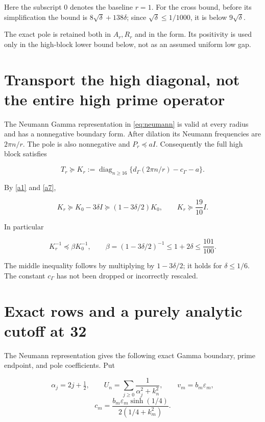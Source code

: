 \documentclass[11pt]{article}
\begin{document}
Here the subscript 0 denotes the baseline \(r=1\). For the cross bound, before its simplification the bound is
\(8\sqrt\delta+138\delta\); since \(\sqrt\delta\le1/1000\), it is below \(9\sqrt\delta\).

The exact pole is retained both in \(A_r,R_r\) and in the form. Its positivity is used only in the high-block lower bound below, not as an assumed uniform low gap.

\section{Transport the high diagonal, not the entire high prime operator}

The Neumann Gamma representation in \eqref{eq:neumann} is valid at every radius and has a nonnegative boundary form. After dilation its Neumann frequencies are \(2\pi n/r\). The pole is also nonnegative and \(P_r\preceq aI\). Consequently the full high block satisfies

\begin{equation}\label{a16}
T_r\succeq K_r:=\operatorname{diag}_{n\ge16}
 \{d_\Gamma(2\pi n/r)-c_\Gamma-a\}.
\end{equation}

By \eqref{a1} and \eqref{a7},

\begin{equation}\label{a17}
K_r\succeq K_0-3\delta I
 \succeq(1-3\delta/2)K_0,
\qquad K_r\succeq\frac{19}{10}I.
\end{equation}

In particular

\begin{equation}\label{a18}
K_r^{-1}\preceq\beta K_0^{-1},
\qquad \beta=(1-3\delta/2)^{-1}
 \le1+2\delta\le\frac{101}{100}.
\end{equation}

The middle inequality follows by multiplying by \(1-3\delta/2\); it holds for \(\delta\le1/6\). The constant \(c_\Gamma\) has not been dropped or incorrectly rescaled.

\section{Exact rows and a purely analytic cutoff at 32}

The Neumann representation gives the following exact Gamma boundary, prime endpoint, and pole coefficients. Put

\[
 \alpha_j=2j+\tfrac12,\qquad
 U_n=\sum_{j\ge0}\frac1{\alpha_j^2+k_n^2},\qquad
 v_m=b_m\varepsilon_m,
\]
\[
 c_m=\frac{b_m\varepsilon_m\sinh(1/4)}{2(1/4+k_m^2)}.
\]
\end{document}
